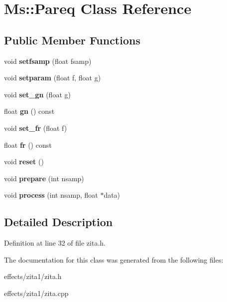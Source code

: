 \hypertarget{class_ms_1_1_pareq}{}\section{Ms\+:\+:Pareq Class Reference}
\label{class_ms_1_1_pareq}
\subsection*{Public Member Functions}
\begin{DoxyCompactItemize}
\item 
\mbox{\label{class_ms_1_1_pareq_af12bfeee042a0a077b95b96c1fefca05}} 
void {\bfseries setfsamp} (float fsamp)
\item 
\mbox{\label{class_ms_1_1_pareq_a09249c1dba11c51e73723e55be04805d}} 
void {\bfseries setparam} (float f, float g)
\item 
\mbox{\label{class_ms_1_1_pareq_a3968e2f26d489e55e87ae570d09c7435}} 
void {\bfseries set\+\_\+gn} (float g)
\item 
\mbox{\label{class_ms_1_1_pareq_a079a9ac36cc78af9fdfc6fec6dd7bef3}} 
float {\bfseries gn} () const
\item 
\mbox{\label{class_ms_1_1_pareq_abf2e46458d917ba57b5e0ba3668a23fb}} 
void {\bfseries set\+\_\+fr} (float f)
\item 
\mbox{\label{class_ms_1_1_pareq_a5ff65947cac2ecb9728fa3e5f992f834}} 
float {\bfseries fr} () const
\item 
\mbox{\label{class_ms_1_1_pareq_aee872934ce6cdfa8ee1d4d3f5eaacae9}} 
void {\bfseries reset} ()
\item 
\mbox{\label{class_ms_1_1_pareq_a7cdf20a4b34c2566299b4304c735d6ba}} 
void {\bfseries prepare} (int nsamp)
\item 
\mbox{\label{class_ms_1_1_pareq_ada7896e4e691ac0d4d2859cd04e3f786}} 
void {\bfseries process} (int nsamp, float $\ast$data)
\end{DoxyCompactItemize}


\subsection{Detailed Description}


Definition at line 32 of file zita.\+h.



The documentation for this class was generated from the following files\+:\begin{DoxyCompactItemize}
\item 
effects/zita1/zita.\+h\item 
effects/zita1/zita.\+cpp\end{DoxyCompactItemize}
